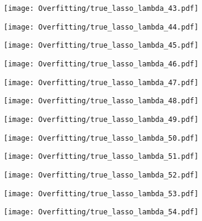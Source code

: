 \documentclass[xcolor=pdftex,dvipsnames,table]{beamer}
\begin{document}
\frame
{
	\begin{center}
		\texttt{[image: Overfitting/true\_lasso\_lambda\_43.pdf]}
	\end{center}
}

\frame
{
	\begin{center}
		\texttt{[image: Overfitting/true\_lasso\_lambda\_44.pdf]}
	\end{center}
}

\frame
{
	\begin{center}
		\texttt{[image: Overfitting/true\_lasso\_lambda\_45.pdf]}
	\end{center}
}

\frame
{
	\begin{center}
		\texttt{[image: Overfitting/true\_lasso\_lambda\_46.pdf]}
	\end{center}
}

\frame
{
	\begin{center}
		\texttt{[image: Overfitting/true\_lasso\_lambda\_47.pdf]}
	\end{center}
}

\frame
{
	\begin{center}
		\texttt{[image: Overfitting/true\_lasso\_lambda\_48.pdf]}
	\end{center}
}

\frame
{
	\begin{center}
		\texttt{[image: Overfitting/true\_lasso\_lambda\_49.pdf]}
	\end{center}
}

\frame
{
	\begin{center}
		\texttt{[image: Overfitting/true\_lasso\_lambda\_50.pdf]}
	\end{center}
}

\frame
{
	\begin{center}
		\texttt{[image: Overfitting/true\_lasso\_lambda\_51.pdf]}
	\end{center}
}

\frame
{
	\begin{center}
		\texttt{[image: Overfitting/true\_lasso\_lambda\_52.pdf]}
	\end{center}
}

\frame
{
	\begin{center}
		\texttt{[image: Overfitting/true\_lasso\_lambda\_53.pdf]}
	\end{center}
}

\frame
{
	\begin{center}
		\texttt{[image: Overfitting/true\_lasso\_lambda\_54.pdf]}
	\end{center}
}
\end{document}
